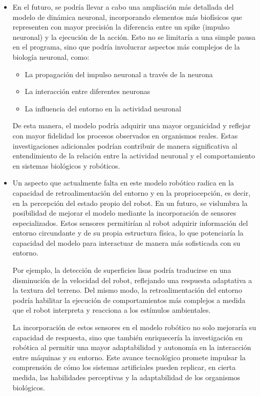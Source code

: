 \begin{itemize}
	\item En el futuro, se podría llevar a cabo una ampliación más detallada del
	modelo de dinámica neuronal, incorporando elementos más biofísicos que
	representen con mayor precisión la diferencia entre un spike (impulso neuronal)
	y la ejecución de la acción. Esto no se limitaría a una simple pausa en el
	programa, sino que podría involucrar aspectos más complejos de la biología
	neuronal, como:
	\begin{itemize}
		\item  La propagación del impulso neuronal a través de la neurona
		\item La interacción entre diferentes neuronas
		\item La influencia del entorno en la actividad neuronal
	\end{itemize}
	De esta manera, el modelo podría adquirir una mayor organicidad y reflejar con
	mayor fidelidad los procesos observados en organismos reales. Estas
	investigaciones adicionales podrían contribuir de manera significativa al
	entendimiento de la relación entre la actividad neuronal y el comportamiento en
	sistemas biológicos y robóticos.
	
	
	\item Un aspecto que actualmente falta en este modelo robótico radica en la capacidad de retroalimentación del entorno y en la propriocepción, es decir, en la percepción del estado propio del robot. En un futuro, se vislumbra la posibilidad de mejorar el modelo mediante la incorporación de sensores especializados. Estos sensores permitirían al robot adquirir información del entorno circundante y de su propia estructura física, lo que potenciaría la capacidad del modelo para interactuar de manera más sofisticada con su entorno.
	
	Por ejemplo, la detección de superficies lisas podría traducirse en una disminución de la velocidad del robot, reflejando una respuesta adaptativa a la textura del terreno. Del mismo modo, la retroalimentación del entorno podría habilitar la ejecución de comportamientos más complejos a medida que el robot interpreta y reacciona a los estímulos ambientales.
	
	La incorporación de estos sensores en el modelo robótico no solo mejoraría su capacidad de respuesta, sino que también enriquecería la investigación en robótica al permitir una mayor adaptabilidad y autonomía en la interacción entre máquinas y su entorno. Este avance tecnológico promete impulsar la comprensión de cómo los sistemas artificiales pueden replicar, en cierta medida, las habilidades perceptivas y la adaptabilidad de los organismos biológicos.
	

\end{itemize}
